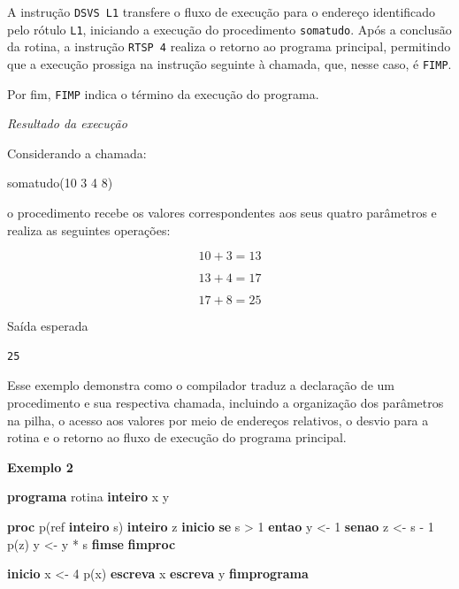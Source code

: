 \documentclass[
  brazilian,
  letterpaper,
]{book}
\newenvironment{Shaded}{\begin{snugshade}}{\end{snugshade}}
\newcommand{\DecValTok}[1]{\textcolor[rgb]{0.68,0.00,0.00}{#1}}
\newcommand{\KeywordTok}[1]{\textcolor[rgb]{0.00,0.23,0.31}{\textbf{#1}}}
\newcommand{\NormalTok}[1]{\textcolor[rgb]{0.00,0.23,0.31}{#1}}
\newcommand{\VariableTok}[1]{\textcolor[rgb]{0.07,0.07,0.07}{#1}}
\theoremstyle{plain}
\theoremstyle{definition}
\theoremstyle{remark}
\begin{document}
A instrução \texttt{DSVS\ L1} transfere o fluxo de execução para o
endereço identificado pelo rótulo \texttt{L1}, iniciando a execução do
procedimento \texttt{somatudo}. Após a conclusão da rotina, a instrução
\texttt{RTSP\ 4} realiza o retorno ao programa principal, permitindo que
a execução prossiga na instrução seguinte à chamada, que, nesse caso, é
\texttt{FIMP}.

Por fim, \texttt{FIMP} indica o término da execução do programa.

\emph{Resultado da execução}

Considerando a chamada:

\begin{Shaded}
\begin{Highlighting}[]
\VariableTok{somatudo}\NormalTok{(}\DecValTok{10} \DecValTok{3} \DecValTok{4} \DecValTok{8}\NormalTok{)}
\end{Highlighting}
\end{Shaded}

o procedimento recebe os valores correspondentes aos seus quatro
parâmetros e realiza as seguintes operações:

\[ 10+3=13 \]

\[ 13+4=17 \]

\[ 17+8=25 \]

Saída esperada

\begin{verbatim}
25
\end{verbatim}

Esse exemplo demonstra como o compilador traduz a declaração de um
procedimento e sua respectiva chamada, incluindo a organização dos
parâmetros na pilha, o acesso aos valores por meio de endereços
relativos, o desvio para a rotina e o retorno ao fluxo de execução do
programa principal.

\textbf{Exemplo 2}

\begin{Shaded}
\begin{Highlighting}[]
\KeywordTok{programa}\NormalTok{ rotina}
  \KeywordTok{inteiro}\NormalTok{ x y}
  
  \KeywordTok{proc}\NormalTok{ p(ref }\KeywordTok{inteiro}\NormalTok{ s)}
    \KeywordTok{inteiro}\NormalTok{ z}
  \KeywordTok{inicio}
    \KeywordTok{se}\NormalTok{ s \textgreater{} }\DecValTok{1}
       \KeywordTok{entao}\NormalTok{ y \textless{}{-} }\DecValTok{1}
       \KeywordTok{senao}\NormalTok{ z \textless{}{-} s {-} }\DecValTok{1}
\NormalTok{             p(z)}
\NormalTok{             y \textless{}{-} y * s}
    \KeywordTok{fimse}
  \KeywordTok{fimproc}

\KeywordTok{inicio}
\NormalTok{   x \textless{}{-} }\DecValTok{4}
\NormalTok{   p(x)}
   \KeywordTok{escreva}\NormalTok{ x}
   \KeywordTok{escreva}\NormalTok{ y}
\KeywordTok{fimprograma}
\end{Highlighting}
\end{Shaded}
\end{document}
